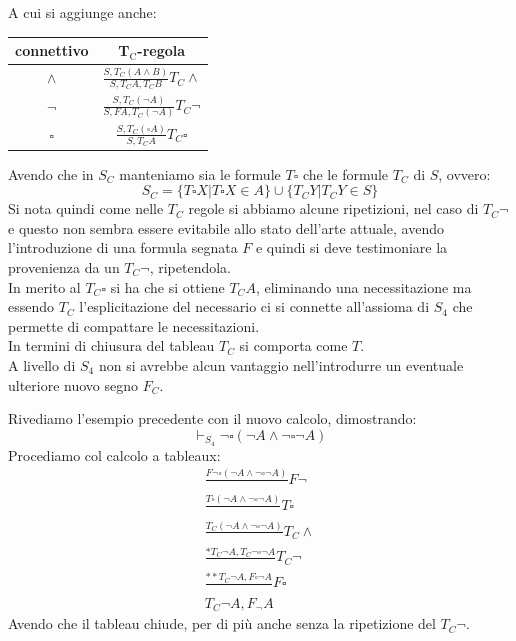 \documentclass[a4paper,12pt, oneside]{book}
\begin{document}
A cui si aggiunge anche:
\begin{table}[H]
  \Large
  \centering
  \begin{tabular}{c||c}
    connettivo& T$_{\mbox{C}}$-regola\\
    \hline
    \hline
    $\land$ & $\frac{S,T_C(A\land B)}{S,T_CA,T_CB}T_C\land$\\
    \hline
    $\neg$ & $\frac{S,T_C(\neg A)}{S,FA,T_C(\neg A)}T_C\neg$\\
    \hline
    $\square$ & $\frac{S,T_C(\square A)}{S,T_CA}T_C\square$
  \end{tabular}
\end{table}
Avendo che in $S_C$ manteniamo sia le formule $T\square$ che le formule $T_C$ di
$S$, ovvero:
\[S_C=\{T\square X|T\square X\in A\}\cup\{T_CY|T_CY\in S\}\]
Si nota quindi come nelle $T_C$ regole si abbiamo alcune ripetizioni, nel caso
di $T_C\neg$ e questo non sembra essere evitabile allo stato dell'arte
attuale, avendo l'introduzione di una formula segnata $F$ e quindi si deve
testimoniare la provenienza da un $T_C\neg$, ripetendola.\\
In merito al $T_C\square$ si ha che si ottiene $T_CA$, eliminando una
necessitazione ma essendo $T_C$ l'esplicitazione del necessario ci si connette
all'assioma di $S_4$ che permette di compattare le necessitazioni.\\
In termini di chiusura del tableau $T_C$ si comporta come $T$.\\
A livello di $S_4$ non si avrebbe alcun vantaggio nell'introdurre un eventuale
ulteriore nuovo segno $F_C$.
\begin{esempio}
  Rivediamo l'esempio precedente con il nuovo calcolo, dimostrando:
  \[\vdash_{S_4}\neg\square(\neg A\land \neg \square\neg A)\]
  Procediamo col calcolo a tableaux:
  \begin{gather*}
    \frac{F\neg\square(\neg A\land \neg \square\neg A)}{}F\neg\\
    \frac{T\square(\neg A\land \neg \square\neg A)}{}T\square\\
    \frac{T_C(\neg A\land \neg \square\neg A)}{}T_C\land\\
    \frac{*T_C\neg A, T_C\neg\square\neg A}{}T_C\neg\\
    \frac{**T_C\neg A, F\square\neg A}{}F\square\\
    T_C\neg A,F_\neg A
  \end{gather*}
  Avendo che il tableau chiude, per di più anche senza la ripetizione del
  $T_C\neg$. 
\end{esempio}
\end{document}
